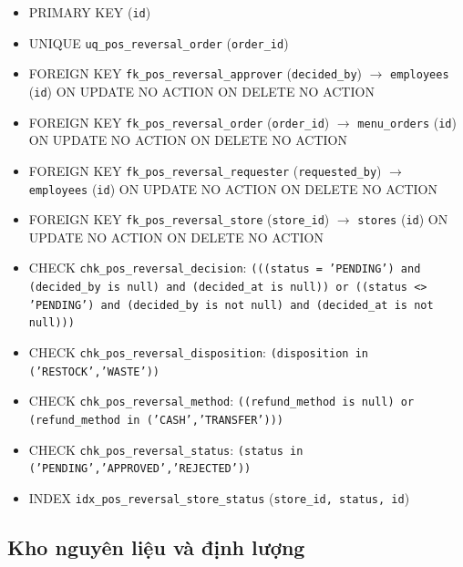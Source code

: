 \begin{itemize}

\item PRIMARY KEY (\texttt{id})

\item UNIQUE \texttt{uq\_pos\_reversal\_order} (\texttt{order\_id})

\item FOREIGN KEY \texttt{fk\_pos\_reversal\_approver} (\texttt{decided\_by}) $\rightarrow$ \texttt{employees} (\texttt{id}) ON UPDATE NO ACTION ON DELETE NO ACTION

\item FOREIGN KEY \texttt{fk\_pos\_reversal\_order} (\texttt{order\_id}) $\rightarrow$ \texttt{menu\_orders} (\texttt{id}) ON UPDATE NO ACTION ON DELETE NO ACTION

\item FOREIGN KEY \texttt{fk\_pos\_reversal\_requester} (\texttt{requested\_by}) $\rightarrow$ \texttt{employees} (\texttt{id}) ON UPDATE NO ACTION ON DELETE NO ACTION

\item FOREIGN KEY \texttt{fk\_pos\_reversal\_store} (\texttt{store\_id}) $\rightarrow$ \texttt{stores} (\texttt{id}) ON UPDATE NO ACTION ON DELETE NO ACTION

\item CHECK \texttt{chk\_pos\_reversal\_decision}: \texttt{(((status = 'PENDING') and (decided\_by is null) and (decided\_at is null)) or ((status <> 'PENDING') and (decided\_by is not null) and (decided\_at is not null)))}

\item CHECK \texttt{chk\_pos\_reversal\_disposition}: \texttt{(disposition in ('RESTOCK','WASTE'))}

\item CHECK \texttt{chk\_pos\_reversal\_method}: \texttt{((refund\_method is null) or (refund\_method in ('CASH','TRANSFER')))}

\item CHECK \texttt{chk\_pos\_reversal\_status}: \texttt{(status in ('PENDING','APPROVED','REJECTED'))}

\item INDEX \texttt{idx\_pos\_reversal\_store\_status} (\texttt{store\_id, status, id})

\end{itemize}

\subsection{Kho nguyên liệu và định lượng}


